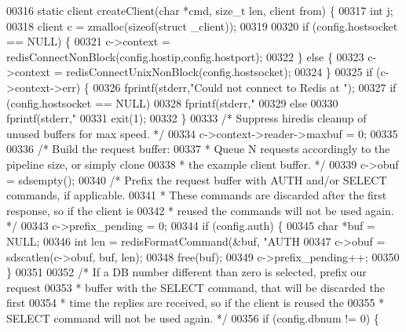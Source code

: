 \begin{DoxyCode}
{{{{00316 \textcolor{keyword}{static} client createClient(\textcolor{keywordtype}{char} *cmd, size\_t len, client from) \{
00317     \textcolor{keywordtype}{int} j;
00318     client c = zmalloc(\textcolor{keyword}{sizeof}(\textcolor{keyword}{struct} \_client));
00319 
00320     \textcolor{keywordflow}{if} (config.hostsocket == NULL) \{
00321         c->context = redisConnectNonBlock(config.hostip,config.hostport);
00322     \} \textcolor{keywordflow}{else} \{
00323         c->context = redisConnectUnixNonBlock(config.hostsocket);
00324     \}
00325     \textcolor{keywordflow}{if} (c->context->err) \{
00326         fprintf(stderr,\textcolor{stringliteral}{"Could not connect to Redis at "});
00327         \textcolor{keywordflow}{if} (config.hostsocket == NULL)
00328             fprintf(stderr,\textcolor{stringliteral}{"%
00329         \textcolor{keywordflow}{else}
00330             fprintf(stderr,\textcolor{stringliteral}{"%
00331         exit(1);
00332     \}
00333     \textcolor{comment}{/* Suppress hiredis cleanup of unused buffers for max speed. */}
00334     c->context->reader->maxbuf = 0;
00335 
00336     \textcolor{comment}{/* Build the request buffer:}
00337 \textcolor{comment}{     * Queue N requests accordingly to the pipeline size, or simply clone}
00338 \textcolor{comment}{     * the example client buffer. */}
00339     c->obuf = sdsempty();
00340     \textcolor{comment}{/* Prefix the request buffer with AUTH and/or SELECT commands, if applicable.}
00341 \textcolor{comment}{     * These commands are discarded after the first response, so if the client is}
00342 \textcolor{comment}{     * reused the commands will not be used again. */}
00343     c->prefix\_pending = 0;
00344     \textcolor{keywordflow}{if} (config.auth) \{
00345         \textcolor{keywordtype}{char} *buf = NULL;
00346         \textcolor{keywordtype}{int} len = redisFormatCommand(&buf, \textcolor{stringliteral}{"AUTH %
00347         c->obuf = sdscatlen(c->obuf, buf, len);
00348         free(buf);
00349         c->prefix\_pending++;
00350     \}
00351 
00352     \textcolor{comment}{/* If a DB number different than zero is selected, prefix our request}
00353 \textcolor{comment}{     * buffer with the SELECT command, that will be discarded the first}
00354 \textcolor{comment}{     * time the replies are received, so if the client is reused the}
00355 \textcolor{comment}{     * SELECT command will not be used again. */}
00356     \textcolor{keywordflow}{if} (config.dbnum != 0) \{
}}}}}}}
\end{DoxyCode}
